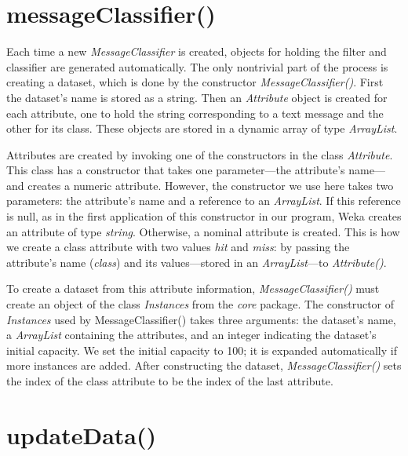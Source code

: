 \section{messageClassifier()}

Each time a new \textit{MessageClassifier} is created, objects for
holding the filter and classifier are generated automatically. The
only nontrivial part of the process is creating a dataset, which is
done by the constructor \textit{MessageClassifier()}. First the
dataset’s name is stored as a string. Then an \textit{Attribute}
object is created for each attribute, one to hold the string
corresponding to a text message and the other for its class. These
objects are stored in a dynamic array of type \textit{ArrayList}.

Attributes are created by invoking one of the constructors in the
class \textit{Attribute}. This class has a constructor that takes one
parameter---the attribute’s name---and creates a numeric
attribute. However, the constructor we use here takes two parameters:
the attribute's name and a reference to an \textit{ArrayList}. If this
reference is null, as in the first application of this constructor in
our program, Weka creates an attribute of type
\textit{string}. Otherwise, a nominal attribute is created. This is
how we create a class attribute with two values \textit{hit} and
\textit{miss}: by passing the attribute's name (\textit{class}) and
its values---stored in an \textit{ArrayList}---to
\textit{Attribute()}.

To create a dataset from this attribute information,
\textit{MessageClassifier()} must create an object of the class
\textit{Instances} from the \textit{core} package. The constructor of
\textit{Instances} used by MessageClassifier() takes three arguments:
the dataset’s name, a \textit{ArrayList} containing the attributes,
and an integer indicating the dataset's initial capacity. We set the
initial capacity to 100; it is expanded automatically if more
instances are added. After constructing the dataset,
\textit{MessageClassifier()} sets the index of the class attribute to
be the index of the last attribute.

\section{updateData()}

